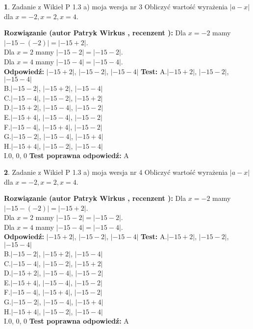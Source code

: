 \documentclass[12pt, a4paper]{article}
\theoremstyle{definition} %
\newtheorem{zad}{}
\newcommand{\zadStart}[1]{\begin{zad}#1\newline}
\newcommand{\zadStop}{\end{zad}}
\newcommand{\rozwStart}[2]{\noindent \textbf{Rozwiązanie (autor #1 , recenzent #2): }\newline}
\newcommand{\rozwStop}{\newline}
\newcommand{\odpStart}{\noindent \textbf{Odpowiedź:}\newline}
\newcommand{\odpStop}{\newline}
\newcommand{\testStart}{\noindent \textbf{Test:}\newline}
\newcommand{\testStop}{\newline}
\newcommand{\kluczStart}{\noindent \textbf{Test poprawna odpowiedź:}\newline}
\newcommand{\kluczStop}{\newline}
\begin{document}
\zadStart{Zadanie z Wikieł P 1.3 a) moja wersja nr 3}
Obliczyć wartość wyrażenia $|a - x|$ dla $x=-2,x=2,x=4$.
\zadStop
\rozwStart{Patryk Wirkus}{}
Dla $x = -2$ mamy $|-15 - (-2)| = |-15 + 2|$.\\
Dla $x = 2$ mamy $|-15 - 2| = |-15 - 2|$.\\
Dla $x = 4$ mamy $|-15 - 4| = |-15 - 4|$.\\
\rozwStop
\odpStart
$|-15 + 2|$, $|-15 - 2|$, $|-15 - 4|$
\odpStop
\testStart
A.$|-15 + 2|$, $|-15 - 2|$, $|-15 - 4|$\\
B.$|-15 - 2|$, $|-15 + 2|$, $|-15 - 4|$\\
C.$|-15 - 4|$, $|-15 - 2|$, $|-15 + 2|$\\
D.$|-15 + 2|$, $|-15 - 4|$, $|-15 - 2|$\\
E.$|-15 + 4|$, $|-15 - 4|$, $|-15 - 2|$\\
F.$|-15 - 4|$, $|-15 + 4|$, $|-15 - 2|$\\
G.$|-15 - 2|$, $|-15 - 4|$, $|-15 + 4|$\\
H.$|-15 + 4|$, $|-15 - 2|$, $|-15 - 4|$\\
I.$0$, $0$, $0$
\testStop
\kluczStart
A
\kluczStop



\zadStart{Zadanie z Wikieł P 1.3 a) moja wersja nr 4}
Obliczyć wartość wyrażenia $|a - x|$ dla $x=-2,x=2,x=4$.
\zadStop
\rozwStart{Patryk Wirkus}{}
Dla $x = -2$ mamy $|-15 - (-2)| = |-15 + 2|$.\\
Dla $x = 2$ mamy $|-15 - 2| = |-15 - 2|$.\\
Dla $x = 4$ mamy $|-15 - 4| = |-15 - 4|$.\\
\rozwStop
\odpStart
$|-15 + 2|$, $|-15 - 2|$, $|-15 - 4|$
\odpStop
\testStart
A.$|-15 + 2|$, $|-15 - 2|$, $|-15 - 4|$\\
B.$|-15 - 2|$, $|-15 + 2|$, $|-15 - 4|$\\
C.$|-15 - 4|$, $|-15 - 2|$, $|-15 + 2|$\\
D.$|-15 + 2|$, $|-15 - 4|$, $|-15 - 2|$\\
E.$|-15 + 4|$, $|-15 - 4|$, $|-15 - 2|$\\
F.$|-15 - 4|$, $|-15 + 4|$, $|-15 - 2|$\\
G.$|-15 - 2|$, $|-15 - 4|$, $|-15 + 4|$\\
H.$|-15 + 4|$, $|-15 - 2|$, $|-15 - 4|$\\
I.$0$, $0$, $0$
\testStop
\kluczStart
A
\kluczStop
\end{document}
